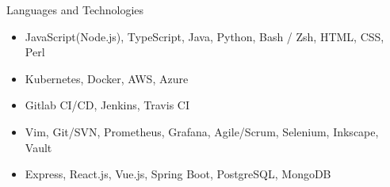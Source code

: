 \documentclass[]{lau}
\begin{document}
	\begin{cvsection}{Languages and Technologies}
		\begin{cvsubsection}{}{}{}
			\begin{itemize}
				\item JavaScript(Node.js), TypeScript, Java, Python, Bash / Zsh, HTML, CSS, Perl
				\item Kubernetes, Docker, AWS, Azure
				\item Gitlab CI/CD, Jenkins, Travis CI
				\item Vim, Git/SVN, Prometheus, Grafana, Agile/Scrum, Selenium, Inkscape, Vault
				\item Express, React.js, Vue.js, Spring Boot, PostgreSQL, MongoDB
			\end{itemize}
		\end{cvsubsection}
	\end{cvsection}
\end{document}
